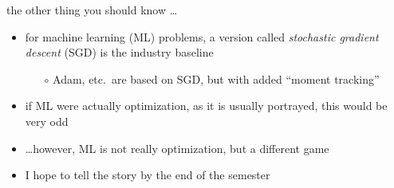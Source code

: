 \documentclass[10pt,hyperref]{beamer}
\begin{document}
\begin{frame}{the other thing you should know \dots}

\begin{itemize}
\item for machine learning (ML) problems, a version called \emph{stochastic gradient descent} (SGD) is the industry baseline
    \begin{itemize}
    \item[$\circ$] Adam, etc.~are based on SGD, but with added ``moment tracking''
    \end{itemize}
\item if ML were actually optimization, as it is usually portrayed, this would be very odd
\item \dots however, ML is not really optimization, but a different game
\item I hope to tell the story by the end of the semester
\end{itemize}
\end{frame}
\end{document}
